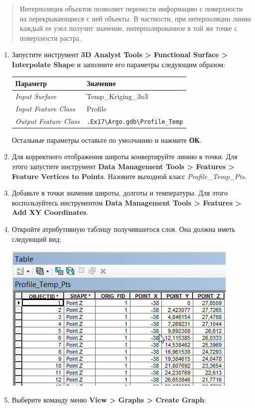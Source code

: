 \documentclass[12pt,]{book}
\begin{document}
\begin{quote}
Интерполяция объектов позволяет перенести информацию с поверхности на перекрывающиеся с ней объекты. В частности, при интерполяции линии каждый ее узел получит значение, интерполированное в той же точке с поверхности растра.
\end{quote}

\begin{enumerate}
\def\labelenumi{\arabic{enumi}.}
\item
  Запустите инструмент \textbf{3D Analyst Tools \textgreater{} Functional Surface \textgreater{} Interpolate Shape} и заполните его параметры следующим образом:

  \begin{longtable}[]{@{}ll@{}}
  \toprule
  Параметр & Значение\tabularnewline
  \midrule
  \endhead
  \emph{Input Surface} & Temp\_Kriging\_3x3\tabularnewline
  \emph{Input Feature Class} & Profile\tabularnewline
  \emph{Output Feature Class} & \texttt{.Ex17\textbackslash{}Argo.gdb\textbackslash{}Profile\_Temp}\tabularnewline
  \bottomrule
  \end{longtable}

  Остальные параметры оставьте по умолчанию и нажмите \textbf{ОК}.
\item
  Для корректного отображения широты конвертируйте линию в точки. Для этого запустите инструмент \textbf{Data Management Tools \textgreater{} Features \textgreater{} Feature Vertices to Points}. Назовите выходной класс \emph{Profile\_Temp\_Pts.}
\item
  Добавьте в точки значения широты, долготы и температуры. Для этого воспользуйтесь инструментом \textbf{Data Management Tools \textgreater{} Features \textgreater{} Add XY Coordinates}.
\item
  Откройте атрибутивную таблицу получившегося слоя. Она должна иметь следующий вид:

  \includegraphics{images/Ex17/image20.png}
\item
  Выберите команду меню \textbf{View \textgreater{} Graphs \textgreater{} Create Graph}:


\end{enumerate}
\end{document}
